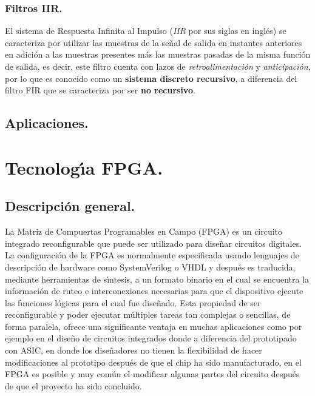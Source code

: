 \subsubsection{Filtros IIR.}

El sistema de Respuesta Infinita al Impulso (\emph{IIR} por sus siglas
en ingl\'{e}s) se caracteriza por utilizar las muestras de la se\~{n}al
de salida en instantes anteriores en adici\'{o}n a las muestras presentes
m\'{a}s las muestras pasadas de la misma funci\'{o}n de salida, es
decir, este filtro cuenta con lazos de \emph{retroalimentaci\'{o}n
}y \emph{anticipaci\'{o}n, }por lo que es conocido como un \textbf{sistema
discreto recursivo}, a diferencia del filtro FIR que se caracteriza
por ser \textbf{no recursivo}.

\subsection{Aplicaciones.}

\section{Tecnolog\'{\i}a FPGA.}

\subsection{Descripci\'{o}n general.}

La Matriz de Compuertas Programables en Campo (FPGA) es un circuito
integrado reconfigurable que puede ser utilizado para dise\~{n}ar
circuitos digitales. La configuraci\'{o}n de la FPGA es normalmente
especificada usando lenguajes de descripci\'{o}n de hardware como
SystemVerilog o VHDL y despu\'{e}s es traducida, mediante herramientas
de s\'{\i}ntesis, a un formato binario en el cual se encuentra la
informaci\'{o}n de ruteo e interconexiones necesarias para que el
dispositivo ejecute las funciones l\'{o}gicas para el cual fue dise\~{n}ado.
Esta propiedad de ser reconfigurable y poder ejecutar m\'{u}ltiples
tareas tan complejas o sencillas, de forma paralela, ofrece una significante
ventaja en muchas aplicaciones como por ejemplo en el dise\~{n}o de
circuitos integrados donde a diferencia del prototipado con ASIC,
en donde los dise\~{n}adores no tienen la flexibilidad de hacer modificaciones
al prototipo despu\'{e}s de que el chip ha sido manufacturado, en
el FPGA es posible y muy com\'{u}n el modificar algunas partes del
circuito despu\'{e}s de que el proyecto ha sido concluido.

